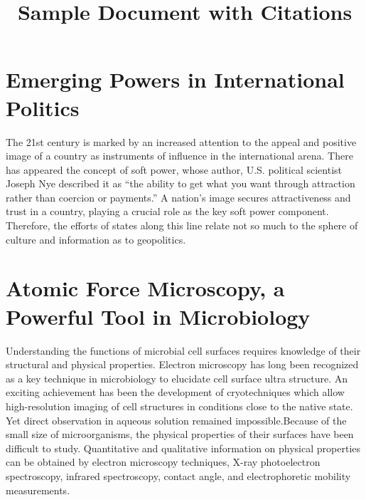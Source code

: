 \documentclass[12pt, a4paper]{article}
\begin{document}
	
	\title{Sample Document with Citations}
	\author{}
	\date{}
	\maketitle
	
	\section{Emerging Powers in International Politics}
	  The 21st century is marked by an increased attention to the appeal and positive image of a country as instruments of influence in the international arena\cite{bohomolov2012ghost}. There has appeared the concept of soft power, whose author, U.S\cite{sergunin2015understanding}. political scientist Joseph Nye described it as “the ability to get what you want through attraction rather than coercion or payments\cite{hill2006moscow}.” A nation’s image secures attractiveness and trust in a country, playing a crucial role as the key soft power component\cite{kiseleva2015russia}. Therefore, the efforts of states along this line relate not so much to the sphere of culture and information as to geopolitics\cite{kosachev2012spsecific}.
	
	
	\section{Atomic Force Microscopy, a Powerful Tool in Microbiology}
      Understanding the functions of microbial cell surfaces requires knowledge of their structural and physical properties\cite{dufrene2002atomic}. Electron microscopy has long been recognized as a key technique in microbiology to elucidate cell surface ultra structure\cite{engel1999atomic}. An exciting achievement has been the development of cryotechniques which allow high-resolution imaging of cell structures in conditions close to the native state\cite{franz2008atomic}. Yet direct observation in aqueous solution remained impossible.Because of the small size of microorganisms, the physical properties of their surfaces have been difficult to study\cite{marrese2017atomic}. Quantitative and qualitative information on physical properties can be obtained by electron microscopy techniques, X-ray photoelectron spectroscopy, infrared spectroscopy, contact angle, and electrophoretic mobility measurements\cite{altman2015noncontact}. 
	
	
	
	
\end{document}
